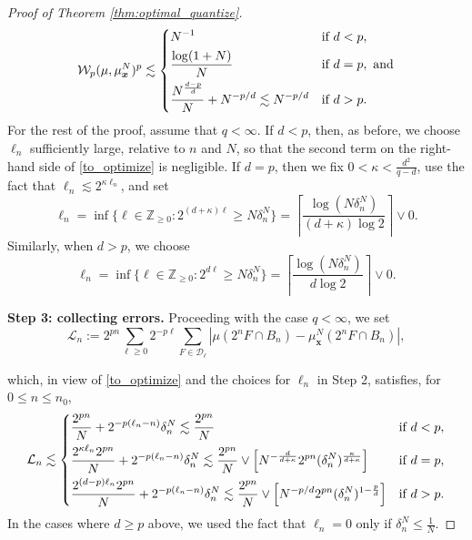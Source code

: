 \documentclass[11pt,reqno]{amsart}
\newcommand{\bx}{{\bm{x}}}
\theoremstyle{definition}
\def\bx{{\boldsymbol x}}
\newcommand{\bm}[1]{\boldsymbol #1}
\newcommand{\ZZ}{{\mathbb Z}}
\newcommand{\mcl}{\mathcal}
\theoremstyle{definition}
\numberwithin{equation}{section}
\numberwithin{lemma}{section}
\numberwithin{proposition}{section}
\numberwithin{theorem}{section}
\numberwithin{corollary}{section}
\numberwithin{definition}{section}
\numberwithin{remark}{section}
\begin{document}
\begin{proof}[Proof of Theorem \ref{thm:optimal_quantize}]
\[
	\mcl W_p(\mu, \mu^N_\bx)^p \lesssim 
	\begin{dcases}
		N^{-1} & \text{if } d < p, \\
		\frac{\log(1+N)}{N} & \text{if } d = p, \text{ and}\\
        \frac{N^{\frac{d-p}{d}}}{N} + N^{-p/d} \lesssim N^{-p/d}  & \text{if } d > p.
    \end{dcases}
\]
For the rest of the proof, assume that $q < \infty$. If $d < p$, then, as before, we choose $\ell_n$ sufficiently large, relative to $n$ and $N$, so that the second term on the right-hand side of \eqref{to_optimize} is negligible. If $d = p$, then we fix $0 < \kappa < \frac{d^2}{q-d}$, use the fact that $\ell_n \lesssim 2^{\kappa \ell_n}$, and set
\[
    \ell_n = \inf \{ \ell \in \ZZ_{\ge 0} : 2^{(d+\kappa)\ell} \ge N \delta_n^N \}
    = \left\lceil \frac{\log (N\delta_n^N)}{(d+ \kappa) \log 2} \right \rceil \vee 0.
\]
Similarly, when $d > p$, we choose
\[
	\ell_n = \inf \{ \ell \in \ZZ_{\ge 0} : 2^{d\ell} \ge N \delta_n^N\} = \left\lceil \frac{\log (N\delta_n^N)}{d \log 2} \right \rceil \vee 0.
\]


\textbf{Step 3: collecting errors.} Proceeding with the case $q < \infty$, we set
\[
    \mcl L_n := 2^{pn} \sum_{\ell \ge 0} 2^{-p\ell} \sum_{F \in \mcl D_\ell} |\mu(2^n F \cap B_n) - \mu^N_\bx(2^n F \cap B_n)|,
\]



which, in view of \eqref{to_optimize} and the choices for $\ell_n$ in Step 2, satisfies, for $0 \le n \le n_0$,
\[
	\mcl L_n
	\lesssim 
	\begin{dcases}
        \frac{2^{pn}}{N} + 2^{-p(\ell_n - n)} \delta_n^N \lesssim
		\frac{2^{pn}}{N} & \text{if } d < p, \\
        \frac{2^{\kappa \ell_n} 2^{pn}}{N} + 2^{-p(\ell_n - n)} \delta_n^N
        \lesssim
        \frac{2^{pn}}{N} \vee \left[ N^{-\frac{d}{d+\kappa}} 2^{pn} (\delta_n^N)^{\frac{\kappa}{d + \kappa}} \right] & \text{if }d = p, \\
		\frac{2^{(d-p) \ell_n} 2^{pn}}{N} + 2^{-p(\ell_n - n)} \delta_n^N
        \lesssim
        \frac{2^{pn}}{N} \vee \left[ N^{-p/d} 2^{pn} (\delta_n^N)^{1 - \frac{p}{d}}\right]
		& \text{if }d > p.
	\end{dcases}
\]
In the cases where $d \ge p$ above, we used the fact that $\ell_n = 0$ only if $\delta_n^N \le \frac{1}{N}$.


\end{proof}
\end{document}

